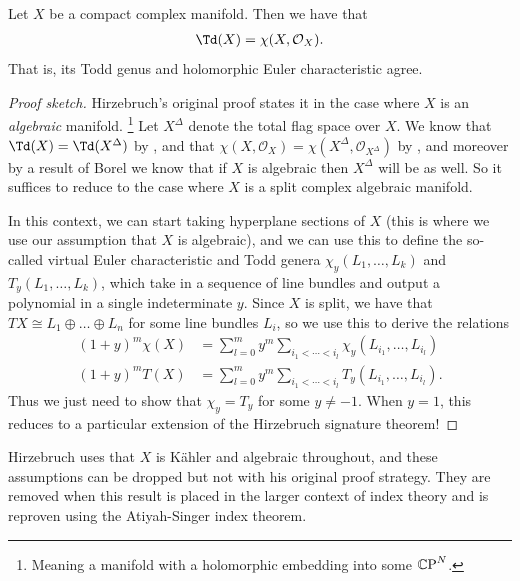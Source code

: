 \documentclass[11pt]{book}
\begin{document}
\begin{theorem}\label{thm:HRR}
\label{thm:hirzebruch-riemann-roch}
Let $X$ be a compact complex manifold. Then we have that
\begin{align*}
    \Td(X) = \chi(X,\mathcal{O}_X).
\end{align*}
That is, its Todd genus and holomorphic Euler characteristic agree.
\end{theorem}
\begin{proof}[Proof sketch]
Hirzebruch's original proof states it in the case where $X$ is an \emph{algebraic} manifold. \footnote{Meaning a manifold with a holomorphic embedding into some ${\mathbb{C}\text{P}}^N$.} Let $X^\Delta$ denote the total flag space over $X$. We know that $\Td(X) = \Td(X^\Delta)$ by , and that $\chi(X,\mathcal{O}_X) = \chi(X^\Delta, \mathcal{O}_{X^\Delta})$ by , and moreover by a result of Borel we know that if $X$ is algebraic then $X^\Delta$ will be as well. So it suffices to reduce to the case where $X$ is a split complex algebraic manifold.

In this context, we can start taking hyperplane sections of $X$ (this is where we use our assumption that $X$ is algebraic), and we can use this to define the so-called virtual Euler characteristic and Todd genera $\chi_y(L_1, \ldots, L_k)$ and $T_y(L_1, \ldots, L_k)$, which take in a sequence of line bundles and output a polynomial in a single indeterminate $y$. Since $X$ is split, we have that $TX \cong L_1 \oplus \ldots \oplus L_n$ for some line bundles $L_i$, so we use this to derive the relations
\begin{align*}
    (1+y)^m \chi(X) &= \sum_{l=0}^m y^m \sum_{i_1 < \cdots < i_l} \chi_y(L_{i_1}, \ldots, L_{i_l}) \\
    (1+y)^m T(X) &= \sum_{l=0}^m y^m \sum_{i_1 < \cdots < i_l} T_y(L_{i_1}, \ldots, L_{i_l}).
\end{align*}
Thus we just need to show that $\chi_y = T_y$ for some $y\ne -1$. When $y=1$, this reduces to a particular extension of the Hirzebruch signature theorem!
\end{proof}

\begin{remark} Hirzebruch uses that $X$ is K\"{a}hler and algebraic throughout, and these assumptions can be dropped but not with his original proof strategy. They are removed when this result is placed in the larger context of index theory and is reproven using the Atiyah-Singer index theorem.
\end{remark}
\end{document}
